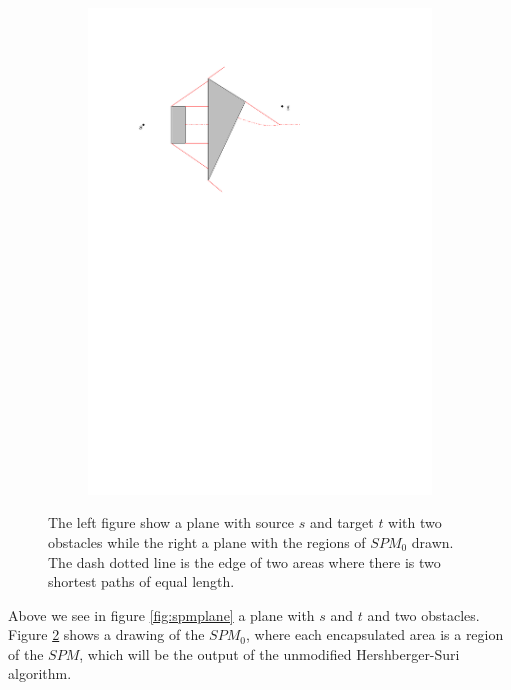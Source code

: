 \begin{figure}[H]
\begin{subfigure}{.5\textwidth}
  \includegraphics[width=.95\linewidth]{figures/spm0.pdf}
  \caption{}
  \label{fig:planewithspm0drawn}
\end{subfigure}
\caption{The left figure show a plane with source $s$ and target $t$ with two obstacles while the 
         right a plane with the regions of $SPM_0$ drawn. The dash dotted line is the edge of two 
  		 areas where there is two shortest paths of equal length.}
\end{figure}

Above we see in figure \ref{fig:spmplane} a plane with $s$ and $t$ and two obstacles. Figure 
\ref{fig:planewithspm0drawn} shows a drawing of the $SPM_0$, where each encapsulated area is 
a region of the $SPM$, which will be the output of the unmodified Hershberger-Suri algorithm. 

